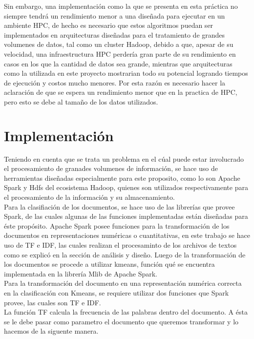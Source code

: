 \documentclass[conference,compsoc]{IEEEtran}
\begin{document}
Sin embargo, una implementación como la que se presenta en esta práctica no siempre tendrá un rendimiento menor a una diseñada para ejecutar en un ambiente HPC, de hecho es necesario que estos algoritmos puedan ser implementados en arquitecturas diseñadas para el tratamiento de grandes volumenes de datos, tal como un cluster Hadoop, debido a que, apesar de su velocidad, una infraestructura HPC perdería gran parte de su rendimiento en casos en los que la cantidad de datos sea grande, mientras que arquitecturas como la utilizada en este proyecto mostrarian todo su potencial logrando tiempos de ejecución y costos mucho menores. Por esta razón es necesario hacer la aclaración de que se espera un rendimiento menor que en la practica de HPC, pero esto se debe al tamaño de los datos utilizados.

\section{Implementación}

Teniendo en cuenta que se trata un problema en el cúal puede estar involucrado el procesamiento de granades volumenes de información, se hace uso de herramientas diseñadas especialmente para este proposito, como lo son Apache Spark y Hdfs del ecosistema Hadoop, quienes son utilizados respectivamente para el procesamiento de la información y su almacenamiento.\\

Para la clasifiación de los documentos, se hace uso de las librerías que provee Spark, de las cuales algunas de las funciones implementadas están diseñadas para éste propósito. Apache Spark posee funciones para la transformación de los documentos en representaciones numéricas o cuantitativas, en este trabajo se hace uso de TF e IDF, las cuales realizan el procesaminto de los archivos de textos como se explicó en la sección de análisis y diseño. Luego de la transformación de los documentos se procede a utilizar kmeans, función qué se encuentra implementada en la librería Mlib de Apache Spark.\\

Para la transformación del documento en una representación numérica  correcta en la clasificación con Kmeans, se requiere utilizar dos funciones que Spark provee, las cuales son TF e IDF.\\

La función TF calcula la frecuencia de las palabras dentro del documento. A ésta se le debe pasar como parametro el documento que queremos transformar y lo hacemos de la siguente manera.\\%
\end{document}

